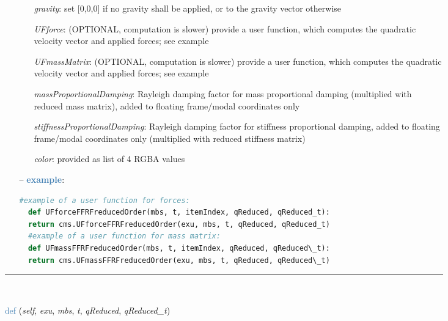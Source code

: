 \begin{itemize}[leftmargin=1.4cm]
\begin{itemize}[leftmargin=1.4cm]
\begin{itemize}[leftmargin=0.5cm]
\begin{itemize}[leftmargin=1.4cm]
\begin{itemize}[leftmargin=1.4cm]
\begin{itemize}[leftmargin=0.5cm]
\begin{itemize}[leftmargin=0.7cm]
\begin{itemize}[leftmargin=1.2cm]
\item[]{\it gravity}: set [0,0,0] if no gravity shall be applied, or to the gravity vector otherwise
\item[]{\it UFforce}: (OPTIONAL, computation is slower) provide a user function, which computes the quadratic velocity vector and applied forces; see example
\item[]{\it UFmassMatrix}: (OPTIONAL, computation is slower) provide a user function, which computes the quadratic velocity vector and applied forces; see example
\item[]{\it massProportionalDamping}: Rayleigh damping factor for mass proportional damping (multiplied with reduced mass matrix), added to floating frame/modal coordinates only
\item[]{\it stiffnessProportionalDamping}: Rayleigh damping factor for stiffness proportional damping, added to floating frame/modal coordinates only (multiplied with reduced stiffness matrix)
\item[]{\it color}: provided as list of 4 RGBA values
\end{itemize}
\item[--]\textcolor{steelblue}{\bf example}: \vspace{-12pt}\ei\begin{lstlisting}[language=Python, xleftmargin=36pt]
  #example of a user function for forces:
  def UFforceFFRFreducedOrder(mbs, t, itemIndex, qReduced, qReduced_t):
  return cms.UFforceFFRFreducedOrder(exu, mbs, t, qReduced, qReduced_t)
  #example of a user function for mass matrix:
  def UFmassFFRFreducedOrder(mbs, t, itemIndex, qReduced, qReduced\_t):
  return cms.UFmassFFRFreducedOrder(exu, mbs, t, qReduced, qReduced\_t)
\end{lstlisting}\vspace{-24pt}\bi\item[]\vspace{-24pt}\vspace{12pt}\end{itemize}
%
\noindent\rule{8cm}{0.75pt}\vspace{1pt} \\ 
\begin{flushleft}
\noindent \textcolor{steelblue}{def {\bf {}}}\label{sec:FEM:ObjectFFRFreducedOrderInterface:UFmassFFRFreducedOrder}
({\it self}, {\it exu}, {\it mbs}, {\it t}, {\it qReduced}, {\it qReduced\_t})
\end{flushleft}

\end{itemize}
\end{itemize}
\end{itemize}
\end{itemize}
\end{itemize}
\end{itemize}
